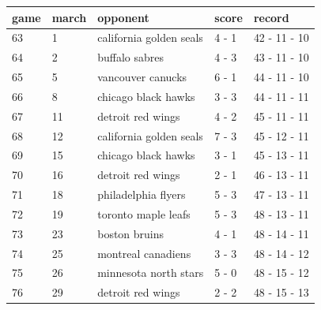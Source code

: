\documentclass{article}
\begin{document}
\begin{tabular}{lllll}
\toprule
game & march & opponent & score & record \\
\midrule
63 & 1 & california golden seals & 4 - 1 & 42 - 11 - 10 \\
64 & 2 & buffalo sabres & 4 - 3 & 43 - 11 - 10 \\
65 & 5 & vancouver canucks & 6 - 1 & 44 - 11 - 10 \\
66 & 8 & chicago black hawks & 3 - 3 & 44 - 11 - 11 \\
67 & 11 & detroit red wings & 4 - 2 & 45 - 11 - 11 \\
68 & 12 & california golden seals & 7 - 3 & 45 - 12 - 11 \\
69 & 15 & chicago black hawks & 3 - 1 & 45 - 13 - 11 \\
70 & 16 & detroit red wings & 2 - 1 & 46 - 13 - 11 \\
71 & 18 & philadelphia flyers & 5 - 3 & 47 - 13 - 11 \\
72 & 19 & toronto maple leafs & 5 - 3 & 48 - 13 - 11 \\
73 & 23 & boston bruins & 4 - 1 & 48 - 14 - 11 \\
74 & 25 & montreal canadiens & 3 - 3 & 48 - 14 - 12 \\
75 & 26 & minnesota north stars & 5 - 0 & 48 - 15 - 12 \\
76 & 29 & detroit red wings & 2 - 2 & 48 - 15 - 13 \\
\bottomrule
\end{tabular}
\end{document}
